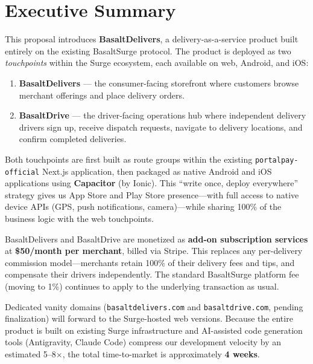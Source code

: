 \documentclass[11pt, letterpaper]{article}
\begin{document}
\tableofcontents
\newpage


\section{Executive Summary}

This proposal introduces \textbf{BasaltDelivers}, a delivery-as-a-service product built entirely on the existing BasaltSurge protocol. The product is deployed as two \emph{touchpoints} within the Surge ecosystem, each available on web, Android, and iOS:

\begin{enumerate}
    \item \textbf{BasaltDelivers} --- the consumer-facing storefront where customers browse merchant offerings and place delivery orders.
    \item \textbf{BasaltDrive} --- the driver-facing operations hub where independent delivery drivers sign up, receive dispatch requests, navigate to delivery locations, and confirm completed deliveries.
\end{enumerate}

Both touchpoints are first built as route groups within the existing \texttt{portalpay-official} Next.js application, then packaged as native Android and iOS applications using \textbf{Capacitor} (by Ionic). This ``write once, deploy everywhere'' strategy gives us App Store and Play Store presence---with full access to native device APIs (GPS, push notifications, camera)---while sharing 100\% of the business logic with the web touchpoints.

BasaltDelivers and BasaltDrive are monetized as \textbf{add-on subscription services} at \textbf{\$50/month per merchant}, billed via Stripe. This replaces any per-delivery commission model---merchants retain 100\% of their delivery fees and tips, and compensate their drivers independently. The standard BasaltSurge platform fee (moving to 1\%) continues to apply to the underlying transaction as usual.

Dedicated vanity domains (\texttt{basaltdelivers.com} and \texttt{basaltdrive.com}, pending finalization) will forward to the Surge-hosted web versions. Because the entire product is built on existing Surge infrastructure and AI-assisted code generation tools (Antigravity, Claude Code) compress our development velocity by an estimated 5--8$\times$, the total time-to-market is approximately \textbf{4 weeks}.
\end{document}
